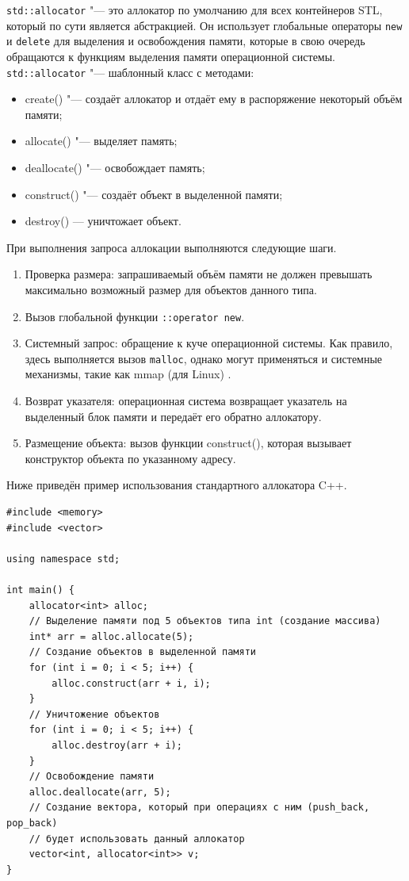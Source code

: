 \texttt{std::allocator} "--- это аллокатор по умолчанию для всех контейнеров STL, который по сути является абстракцией. Он использует глобальные операторы \texttt{new} и \texttt{delete} для выделения и освобождения памяти, которые в свою очередь обращаются к функциям выделения памяти операционной системы. \texttt{std::allocator} "--- шаблонный класс с методами:

\begin{itemize}
	\item create() "--- создаёт аллокатор и отдаёт ему в распоряжение некоторый объём памяти;
	\item allocate() "--- выделяет память;
	\item deallocate() "--- освобождает память;
	\item construct() "--- создаёт объект в выделенной памяти;
	\item destroy() — уничтожает объект.
\end{itemize}

При выполнения запроса аллокации выполняются следующие шаги.

\begin{enumerate}
	\item Проверка размера: запрашиваемый объём памяти не должен превышать максимально возможный размер для объектов данного типа.
	\item Вызов глобальной функции \texttt{::operator new}.
	\item Системный запрос: обращение к куче операционной системы. Как правило, здесь выполняется вызов \texttt{malloc}, однако могут применяться и системные механизмы, такие как mmap (для Linux) \cite{itmo-assignment}. 
	\item Возврат указателя: операционная система возвращает указатель на выделенный блок памяти и передаёт его обратно аллокатору.
	\item Размещение объекта: вызов функции construct(), которая вызывает конструктор объекта по указанному адресу.
\end{enumerate}

Ниже приведён пример использования стандартного аллокатора C++.

\small
\begin{verbatim}
#include <memory>
#include <vector>

using namespace std;

int main() {
    allocator<int> alloc;
	// Выделение памяти под 5 объектов типа int (создание массива)
    int* arr = alloc.allocate(5);
    // Создание объектов в выделенной памяти
    for (int i = 0; i < 5; i++) {
        alloc.construct(arr + i, i);
    }
    // Уничтожение объектов
    for (int i = 0; i < 5; i++) {
        alloc.destroy(arr + i);
    }
    // Освобождение памяти
    alloc.deallocate(arr, 5);
	// Создание вектора, который при операциях с ним (push_back, pop_back)
	// будет использовать данный аллокатор
    vector<int, allocator<int>> v;
}
\end{verbatim}
\normalsize


